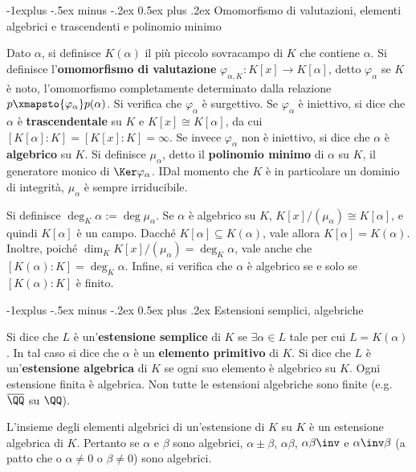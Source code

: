 \documentclass[10pt,landscape]{article}
\makeatletter
\renewcommand{\subsection}{\@startsection{subsection}{2}{0mm}%
	{-1explus -.5ex minus -.2ex}%
	{0.5ex plus .2ex}%
	{\normalfont\normalsize\bfseries}}
\makeatother
\begin{document}
\begin{multicols}{3}
		
		\subsection{Omomorfismo di valutazioni, elementi algebrici e trascendenti e polinomio minimo}
		
		
		Dato $\alpha$, si definisce $K(\alpha)$ il più piccolo
		sovracampo di $K$ che contiene $\alpha$. Si definisce l'\textbf{omomorfismo di
		valutazione} $\varphi_{\alpha, K} : K[x] \to K[\alpha]$, detto
		$\varphi_\alpha$ se $K$ è noto, l'omomorfismo completamente
		determinato dalla relazione $p \xmapsto{\varphi_\alpha} p(\alpha)$. Si verifica che $\varphi_\alpha$ è
		surgettivo. Se $\varphi_\alpha$ è iniettivo,
		si dice che $\alpha$ è \textbf{trascendentale} su $K$ e
		$K[x] \cong K[\alpha]$, da cui $[K[\alpha] : K] =
		[K[x] : K] = \infty$. Se invece $\varphi_\alpha$ non
		è iniettivo, si dice che $\alpha$ è \textbf{algebrico}
		su $K$. Si definisce $\mu_\alpha$, detto il \textbf{polinomio
		minimo} di $\alpha$ su $K$, il generatore monico
		di $\Ker \varphi_\alpha$. IDal momento che $K$ è
		in particolare un dominio di integrità, $\mu_\alpha$ è sempre irriducibile. \medskip
		
		
		Si definisce
		$\deg_K \alpha := \deg \mu_\alpha$. Se $\alpha$ è
		algebrico su $K$, $K[x] / (\mu_\alpha) \cong
		K[\alpha]$, e quindi $K[\alpha]$ è un campo. Dacché
		$K[\alpha] \subseteq K(\alpha)$, vale allora
		$K[\alpha] = K(\alpha)$. Inoltre, poiché $\dim_K K[x] / (\mu_\alpha) = \deg_K \alpha$, vale
		anche che $[K(\alpha) : K] = \deg_K \alpha$.
		Infine, si verifica che $\alpha$ è algebrico se e solo se
		$[K(\alpha) : K]$ è finito. \medskip


		\subsection{Estensioni semplici, algebriche}

		
		Si dice che $L$ è un'\textbf{estensione semplice} di
		$K$ se $\exists \alpha \in L$ tale per cui $L = K(\alpha)$.
		In tal caso si dice che $\alpha$ è un \textbf{elemento primitivo} di $K$. Si dice che $L$ è un'\textbf{estensione
		algebrica} di $K$ se ogni suo elemento è algebrico su $K$.
		Ogni estensione finita è algebrica. Non tutte le
		estensioni algebriche sono finite (e.g.~$\overline{\QQ}$ su $\QQ$). \medskip
		
		
		L'insieme degli elementi algebrici di un'estensione
		di $K$ su $K$ è un estensione algebrica di $K$.
		Pertanto se $\alpha$ e $\beta$ sono algebrici,
		$\alpha \pm \beta$, $\alpha \beta$, $\alpha \beta\inv$
		e $\alpha\inv \beta$ (a patto che o $\alpha \neq 0$ o
		$\beta \neq 0$) sono algebrici.  
		

\end{multicols}
\end{document}
